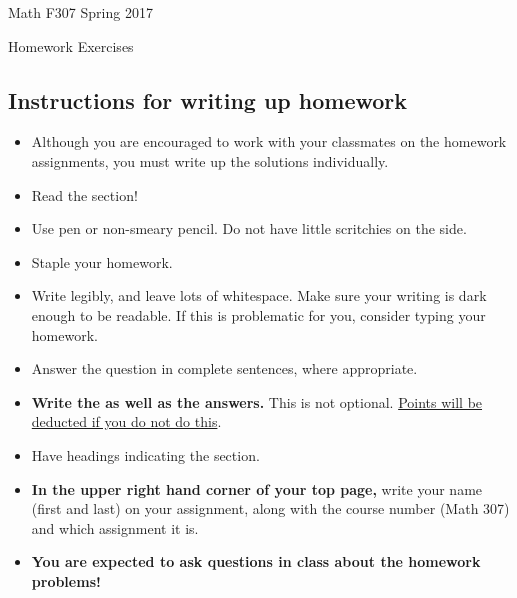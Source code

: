 \documentclass[11pt]{amsart}
\begin{document}
\begin{center}
\begin{Large} Math F307 \hfill Spring 2017

Homework Exercises 
\end{Large}
\end{center}

\subsection*{Instructions for writing up homework}
\begin{itemize}
\item Although you are encouraged to work with your classmates on the homework assignments, you must write up the solutions individually.
\item Read the section!
 \item Use pen or non-smeary pencil. Do not have little scritchies on the side. 
 \item Staple your homework. 
 \item Write legibly, and leave lots of whitespace. Make sure your writing is dark enough to be readable. If this is problematic for you, consider typing your homework.
 \item Answer the question in complete sentences, where appropriate.
\item {\bf Write the  as well as the answers. } This is not optional. \underline{Points will be deducted if you do not do this}.
\item Have headings indicating the section.
\item {\bf In the upper right hand corner of your top page,} write your name (first and last) on your assignment, along with the course number (Math 307) and which assignment it is.
\item {\bf You are expected to ask questions in class about the homework problems!}
\end{itemize}
\end{document}
